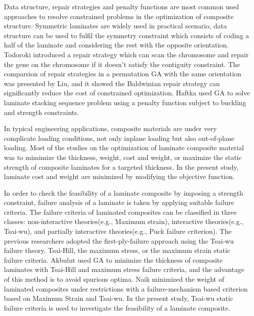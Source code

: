 \documentclass[USenglish]{article}
\begin{document}
  Data structure, repair strategies and penalty functions\cite{le1995improved} are most common used
approaches to resolve constrained problems in the optimization of composite structure. Symmetric
laminates are widely used in practical scenario, data structure can be used to fulfil the symmetry
constraint which consists of coding a half of the laminate and considering the rest with the
opposite orientation. Todoroki\cite{todoroki1998stacking} introduced a repair strategy which can scan the chromosome and
repair the gene on the chromosome if it doesn't satisfy the contiguity constraint. The comparsion of
repair strategies in a permutation GA with the same orientation was presented by Liu\cite{liu2000permutation}, and it
showed the Baldwinian repair strategy can significantly reduce the cost of constrained optimization.
Haftka\cite{riche1993optimization} used GA to solve laminate stacking sequence problem using a penalty function subject to
buckling and strength constraints.

  In typical engineering applications, composite materials are under very complicate loading
conditions, not only inplane loading but also out-of-plane loading. Most of the studies on the
optimization of laminate composite material was to mimimize the
thickness\cite{abu1998optimum,walker2003technique},
weight\cite{fang1993design,deka2005multiobjective,park2008improved}, cost and
weight\cite{deka2005multiobjective,omkar2008artificial}, or maximize the static strength of
composite laminates for a targeted
thickness\cite{walker2003technique,lin2004stacking,kim2007development}. In the present study,
laminate cost and weight are minimized by modifying the objective function.

  In order to check the feasibility of a laminate composite by imposing a strength constraint, failure
analysis of a laminate is taken by applying suitable failure criteria. The failure criteria of
laminated composites can be classified in three classes: non-interactive theories(e.g., Maximum
strain), interactive theories(e.g., Tsai-wu), and partially interactive theories(e.g., Puck failure
criterion). The previous researchers adopted the first-ply-failure approach using the Tsai-wu
failure
theory\cite{massard1984computer,reddy1987first,fang1993design,soeiro1994multilevel,pelletier2006multi,jadhav2007parametric,omkar2008artificial,choudhury2019failure},
Tsai-Hill\cite{martin1987optimum,soares1995discrete}, the maximum stress\cite{watkins1987multicriteria}, or the maximum strain\cite{watkins1987multicriteria}
static failure criteria. Akbulut\cite{akbulut2008optimum} used GA to minimize the thickness of composite laminates with
Tsai-Hill and maximum stress failure criteria, and the advantage of this method is to avoid spurious
optima. Naik\cite{naik2008design}
 minimized the weight of laminated composites under restrictions with a
failure-mechanism based criterion based on Maximum Strain and Tsai-wu. In the present study, Tsai-wu
static failure criteria is used to investigate  the feasibility of a laminate composite.
    
\end{document}
